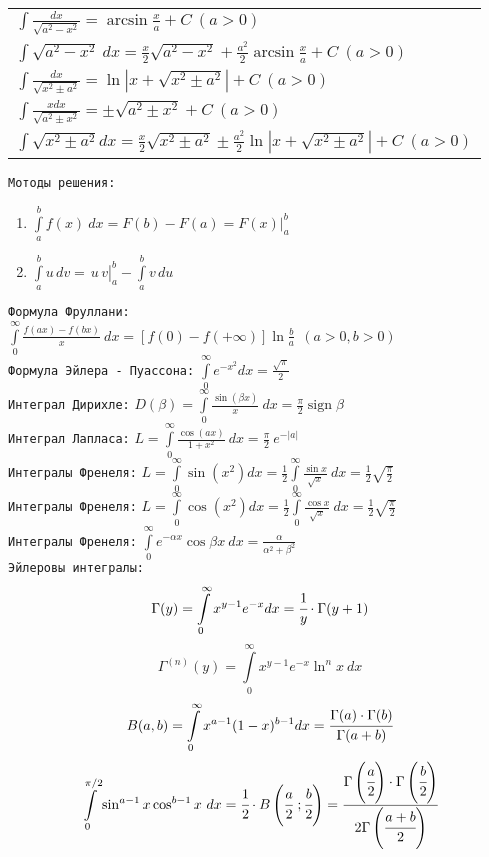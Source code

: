 \documentclass[12pt, a4paper]{article}
\DeclareMathOperator{\sign}{sign}
\begin{document}
\begin{tabular}{l}
$ \displaystyle \int{\frac{dx}{\sqrt{a^2-x^2}}} = \arcsin \frac{x}{a} + C \ (a>0) $ \\
$ \displaystyle \int{\sqrt{a^2-x^2}\ dx} = \frac x2\sqrt{a^2-x^2} + \frac{a^2}{2}\arcsin \frac{x}{a} + C \ (a>0) $ \\
$ \displaystyle \int{\frac{dx}{\sqrt{x^2\pm a^2}}} = \ln \left|x+\sqrt{x^2\pm a^2} \right| + C \ (a>0) $ \\
$ \displaystyle \int{\frac{xdx}{\sqrt{a^2 \pm x^2}}} = \pm \sqrt{a^2 \pm x^2} + C \ (a>0) $ \\
$ \displaystyle \int{\sqrt{x^2\pm a^2} dx} = \frac{x}{2} \sqrt{x^2\pm a^2} \pm \frac{a^2}{2} \ln \left|x+\sqrt{x^2\pm a^2}\right| + C \ (a>0) $ \\
\end{tabular}
\par \- \newline
{\tt Мотоды решения:}
\begin{enumerate}
	\item $ \displaystyle \int\limits_a^b {f(x)\ dx} = F(b)-F(a) = F(x)\biggr |^b_a$
	\item $ \displaystyle \int\limits_a^b {u\,dv} = \left.\frac{}{} u\,v \right|_a^b -\int\limits_a^b{v\, du} $ 
\end{enumerate}
\newpage 
\par \- \newline
{\tt Формула Фруллани:}
$\displaystyle \int\limits_0^\infty{\frac{f(ax)-f(bx)}{x}\ dx} = [f(0)-f(+\infty)]\ln{\frac{b}{a}} \ \ (a>0,b>0) $
\\ {\tt Формула Эйлера - Пуассона:}
$\displaystyle \int\limits_0^\infty{e^{-x^2} dx} = \frac{\sqrt{\pi}}{2} $
\\ {\tt Интеграл Дирихле:}
$\displaystyle D(\beta) = \int\limits_0^\infty{\frac{\sin(\beta x)}{x}\ dx} = \frac{\pi}{2} \sign{\beta} $
\\ {\tt Интеграл Лапласа:}
$\displaystyle L = \int\limits_0^\infty{\frac{\cos(ax)}{1+x^2}\ dx} = \frac{\pi}{2}\ e^{-|a|}$
\\ {\tt Интегралы Френеля:} $\displaystyle L = \int\limits_0^\infty{\sin(x^2) dx} = \frac{1}{2} \int\limits_0^\infty{\frac{\sin x}{\sqrt{x}}\ dx} = \frac{1}{2}\sqrt{\frac{\pi}{2}}$ \\
{\tt Интегралы Френеля:} $\displaystyle L = \int\limits_0^\infty{\cos(x^2) dx} = \frac{1}{2} \int\limits_0^\infty{\frac{\cos x}{\sqrt{x}}\ dx} = \frac{1}{2}\sqrt{\frac{\pi}{2}}$ \\
{\tt Интегралы Френеля:} $\displaystyle \int\limits_0^\infty{e^{-\alpha x} \cos \beta x \ dx} = \frac{\alpha}{\alpha^2+\beta^2} $ \\
{\tt Эйлеровы интегралы:} 
$$ \Gamma(y) = \int\limits_0^\infty{x^{y-1}e^{-x}dx} = \cfrac{1}{y} \cdot \Gamma(y+1) $$
$$ \Gamma^{(n)}(y) = \int\limits_0^\infty{x^{y-1}e^{-x}\ln^{n}x\ dx} $$
$$ B(a,b) = \int\limits^\infty_0{x^{a-1}(1-x)^{b-1}dx} = \cfrac{\Gamma(a) \cdot \Gamma(b)}{\Gamma(a+b)} $$
$$ \int\limits_0^{\pi/2}{\sin^{a-1} x \cos^{b-1} x\ dx} = \cfrac{1}{2} \cdot B \left(\cfrac{a}{2}\ ;\cfrac{b}{2}\right) =\cfrac{\Gamma\left(\cfrac a 2 \right)\cdot\Gamma\left(\cfrac b 2 \right)}{2\Gamma\left(\cfrac{a+b}{2}\right)}$$
\end{document}
